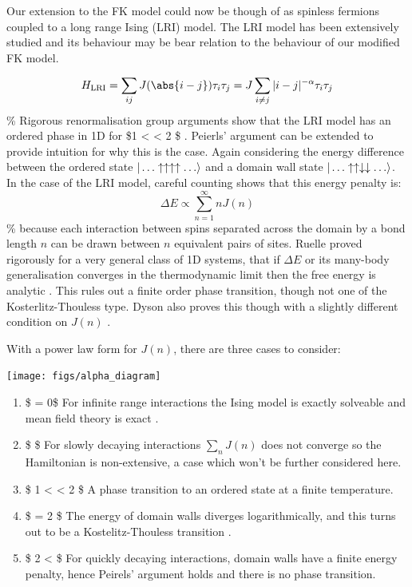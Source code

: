 Our extension to the FK model could now be though of as spinless fermions coupled to a long range Ising (LRI) model. The LRI model has been extensively studied and its behaviour may be bear relation to the behaviour of our modified FK model.

\[H_{\mathrm{LRI}} = \sum_{ij} J(\abs{i-j}) \tau_i \tau_j = J \sum_{i\neq j} |i - j|^{-\alpha} \tau_i \tau_j\] \% Rigorous renormalisation group arguments show that the LRI model has an ordered phase in 1D for \$1 \textless{} \alpha \textless{} 2 \$ \autocite{dysonExistencePhasetransitionOnedimensional1969}. Peierls' argument can be extended \autocite{thoulessLongRangeOrderOneDimensional1969} to provide intuition for why this is the case. Again considering the energy difference between the ordered state \(|\ldots\uparrow\uparrow\uparrow\uparrow\ldots\rangle\) and a domain wall state \(|\ldots\uparrow\uparrow\downarrow\downarrow\ldots\rangle\). In the case of the LRI model, careful counting shows that this energy penalty is: \[\Delta E \propto \sum_{n=1}^{\infty} n J(n)\] \% because each interaction between spins separated across the domain by a bond length \(n\) can be drawn between \(n\) equivalent pairs of sites. Ruelle proved rigorously for a very general class of 1D systems, that if \(\Delta E\) or its many-body generalisation converges in the thermodynamic limit then the free energy is analytic \autocite{ruelleStatisticalMechanicsOnedimensional1968}. This rules out a finite order phase transition, though not one of the Kosterlitz-Thouless type. Dyson also proves this though with a slightly different condition on \(J(n)\) \autocite{dysonExistencePhasetransitionOnedimensional1969}.

With a power law form for \(J(n)\), there are three cases to consider:

\begin{center}
    \texttt{[image: figs/alpha\_diagram]}
\end{center}

\begin{enumerate}
\def\labelenumi{\arabic{enumi}.}
\tightlist
\item
  \$ \alpha = 0\$ For infinite range interactions the Ising model is exactly solveable and mean field theory is exact \autocite{lipkinValidityManybodyApproximation1965}.
\item
  \$ \alpha {}\$ For slowly decaying interactions \(\sum_n J(n)\) does not converge so the Hamiltonian is non-extensive, a case which won't be further considered here.
\item
  \$ 1 \textless{} \alpha \textless{} 2 \$ A phase transition to an ordered state at a finite temperature.
\item
  \$ \alpha = 2 \$ The energy of domain walls diverges logarithmically, and this turns out to be a Kostelitz-Thouless transition \autocite{thoulessLongRangeOrderOneDimensional1969}.
\item
  \$ 2 \textless{} \alpha \$ For quickly decaying interactions, domain walls have a finite energy penalty, hence Peirels' argument holds and there is no phase transition.
\end{enumerate}


